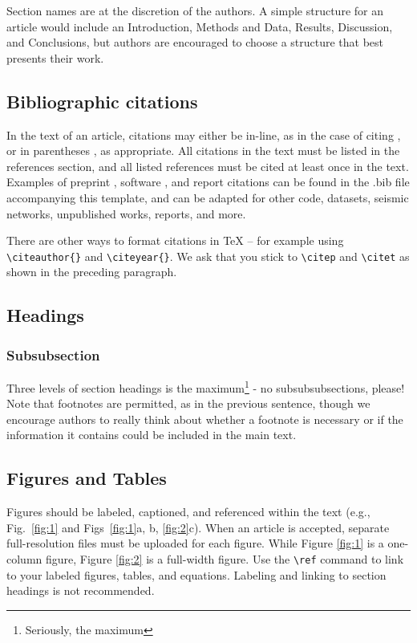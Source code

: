 \documentclass[]{seismica}
\begin{document}
	Section names are at the discretion of the authors. A simple structure for an article would include an Introduction, Methods and Data, Results, Discussion, and Conclusions, but authors are encouraged to choose a structure that best presents their work.
	
	\subsection{Bibliographic citations}
	In the text of an article, citations may either be in-line, as in the case of citing \citet{metropolis_monte_1949}, or in parentheses \citep[e.g.,][]{metropolis_monte_1949}, as appropriate. All citations in the text must be listed in the references section, and all listed references must be cited at least once in the text. Examples of preprint \citep{van_den_ende_creating_2021}, software \citep{rf_software}, and report \citep{mueller_documentation_2003} citations can be found in the .bib file accompanying this template, and can be adapted for other code, datasets, seismic networks, unpublished works, reports, and more.

        There are other ways to format citations in TeX -- for example using \texttt{\textbackslash citeauthor\{\}} and \texttt{\textbackslash citeyear\{\}}. We ask that you stick to \texttt{\textbackslash citep} and \texttt{\textbackslash citet} as shown in the preceding paragraph.
	
	\subsection{Headings}
	\subsubsection{Subsubsection}
	Three levels of section headings is the maximum\footnote{Seriously, the maximum} - no subsubsubsections, please! Note that footnotes are permitted, as in the previous sentence, though we encourage authors to really think about whether a footnote is necessary or if the information it contains could be included in the main text.
	
	\subsection{Figures and Tables}
	Figures should be labeled, captioned, and referenced within the text (e.g., Fig.~\ref{fig:1} and Figs~\ref{fig:1}a, b, \ref{fig:2}c). When an article is accepted, separate full-resolution files must be uploaded for each figure. While Figure \ref{fig:1} is a one-column figure, Figure \ref{fig:2} is a full-width figure. Use the \texttt{\textbackslash ref} command to link to your labeled figures, tables, and equations. Labeling and linking to section headings is not recommended.
	
\end{document}

